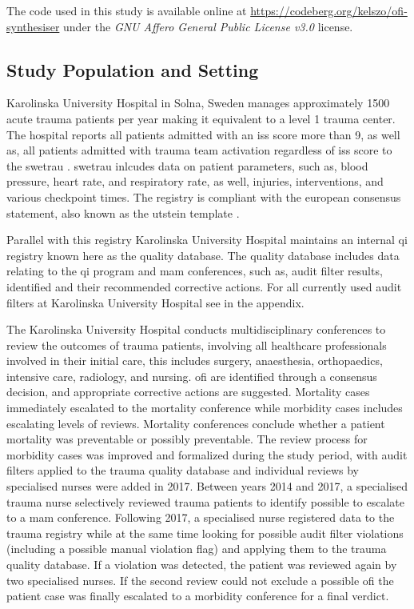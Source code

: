 \documentclass[12pt, letterpaper]{article}
\begin{document}
The code used in this study is available online at \url{https://codeberg.org/kelszo/ofi-synthesiser} under the \textit{GNU Affero General Public License v3.0} license.

\subsection{Study Population and Setting}
Karolinska University Hospital in Solna, Sweden manages approximately 1500 acute trauma patients per year making it equivalent to a level 1 trauma center. The hospital reports all patients admitted with an \acrfull{iss} score more than 9, as well as, all patients admitted with trauma team activation regardless of \acrshort{iss} score to the \acrfull{swetrau} \cite{swetrau}. \acrshort{swetrau} inlcudes data on patient parameters, such as, blood pressure, heart rate, and respiratory rate, as well, injuries, interventions, and various checkpoint times. The registry is compliant with the european consensus statement, also known as the utstein template \cite{ringdal_utstein_2008}.

Parallel with this registry Karolinska University Hospital maintains an internal \acrshort{qi} registry known here as the quality database. The quality database includes data relating to the \acrshort{qi} program and \acrshort{mam} conferences, such as, audit filter results, identified  and their recommended corrective actions. For all currently used audit filters at Karolinska University Hospital see  in the appendix.

The Karolinska University Hospital conducts multidisciplinary conferences to review the outcomes of trauma patients, involving all healthcare professionals involved in their initial care, this includes surgery, anaesthesia, orthopaedics, intensive care, radiology, and nursing. \acrshort{ofi} are identified through a consensus decision, and appropriate corrective actions are suggested. Mortality cases immediately escalated to the mortality conference while morbidity cases includes escalating levels of reviews. Mortality conferences conclude whether a patient mortality was preventable or possibly preventable. The review process for morbidity cases was improved and formalized during the study period, with audit filters applied to the trauma quality database and individual reviews by specialised nurses were added in 2017. Between years 2014 and 2017, a specialised trauma nurse selectively reviewed trauma patients to identify possible  to escalate to a \acrshort{mam} conference. Following 2017, a specialised nurse registered data to the trauma registry while at the same time looking for possible audit filter violations (including a possible manual violation flag) and applying them to the trauma quality database. If a violation was detected, the patient was reviewed again by two specialised nurses. If the second review could not exclude a possible \acrshort{ofi} the patient case was finally escalated to a morbidity conference for a final verdict.
\end{document}
